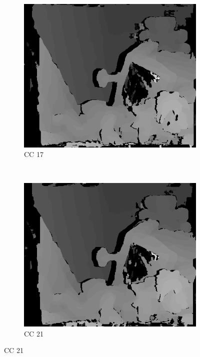 \begin{figure}
\begin{subfigure}[b]{0.23\textwidth}
    \centering
    \includegraphics[width=\textwidth]{images/stereo-pairs/teddy_dual_crosschecked_17.png}
    \caption{CC 17}
  \end{subfigure}
  ~
  \begin{subfigure}[b]{0.23\textwidth}
    \centering
    \includegraphics[width=\textwidth]{images/stereo-pairs/teddy_dual_crosschecked_21.png}
    \caption{CC 21}
  \end{subfigure}





\end{figure}
